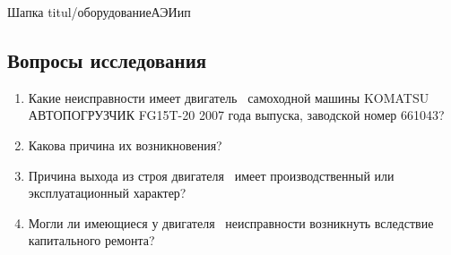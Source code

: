 \setcounter{page}{1}

%
 Шапка 
{titul/оборудованиеАЭИип}  
%
\subsection{Вопросы исследования}
\begin{enumerate}
   
   \item
    Какие неисправности имеет двигатель \, самоходной машины  KOMATSU   АВТОПОГРУЗЧИК  FG15T-20   2007 года выпуска, заводской номер 661043?
   
  \item
    Какова причина их возникновения?
   
  \item
    Причина выхода из строя  двигателя \,  имеет производственный или эксплуатационный характер?
   
  \item
    Могли ли имеющиеся у  двигателя \, неисправности возникнуть вследствие капитального ремонта?
  

  
%	
\end{enumerate}


